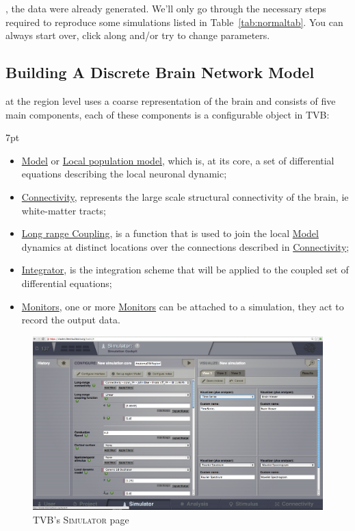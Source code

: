 \documentclass{tufte-handout}
\newenvironment{blah}{%
  \def\FrameCommand{%
    \hspace{1pt}%
    {\color{DarkOrange}\vrule width 2pt}%
    {\color{PeachPuff}\vrule width 4pt}%
    \colorbox{PeachPuff}%
  }%
  \MakeFramed{\advance\hsize-\width\FrameRestore}%
  \noindent\hspace{-4.55pt}%
  \begin{adjustwidth}{}{7pt}%
  \vspace{2pt}\vspace{2pt}%
}
{%
  \vspace{2pt}\end{adjustwidth}\endMakeFramed%
}
\begin{document}
, 
the data were already generated. We'll only go through the necessary steps
required to reproduce some simulations listed in Table~\ref{tab:normaltab}.
You can always start over, click along and/or try to change parameters.


\subsection{Building A Discrete Brain Network Model}\label{sec:region_simulations}

at the region level uses a coarse representation of the brain and consists of
five main components, each of these components is a configurable object in
TVB:

\begin{blah}
\begin{itemize}
\item \underline{Model} or \underline{Local population model}, which is, at its core, a set of differential equations describing the local neuronal dynamic;
\item \underline{Connectivity}, represents the large scale structural connectivity of the brain, ie white-matter tracts;
\item \underline{Long range Coupling}, is a function that is used to join the local \underline{Model} dynamics at distinct locations over the connections described in \underline{Connectivity};
\item \underline{Integrator}, is the integration scheme that will be applied to the coupled set of differential equations;
\item \underline{Monitors}, one or more \underline{Monitors} can be attached to a simulation, they act to record the output data.
\end{itemize}
\end{blah}

\begin{figure}[h]
  \includegraphics[width=\linewidth]{Handout_UI_BuildingYourOwnBrainNetworkModel_SimulatorArea}%
  \caption{TVB's \textsc{Simulator} page}%
  \label{fig:fig}%
\end{figure}
\end{document}
